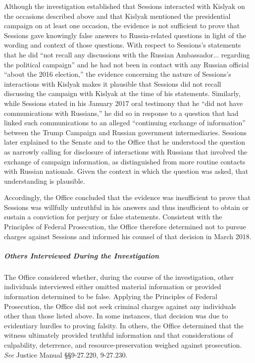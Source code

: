 Although the investigation established that Sessions interacted with Kislyak on the occasions described above and that Kislyak mentioned the presidential campaign on at least one occasion, the evidence is not sufficient to prove that Sessions gave knowingly false answers to Russia-related questions in light of the wording and context of those questions.
With respect to Sessions's statements that he did ``not recall any discussions with the Russian Ambassador... regarding the political campaign'' and he had not been in contact with any Russian official ``about the 2016 election,'' the evidence concerning the nature of Sessions's interactions with Kislyak makes it plausible that Sessions did not recall discussing the campaign with Kislyak at the time of his statements.
Similarly, while Sessions stated in his January 2017 oral testimony that he ``did not have communications with Russians,'' he did so in response to a question that had linked such communications to an alleged ``continuing exchange of information'' between the Trump Campaign and Russian government intermediaries.
Sessions later explained to the Senate and to the Office that he understood the question as narrowly calling for disclosure of interactions with Russians that involved the exchange of campaign information, as distinguished from more routine contacts with Russian nationals.
Given the context in which the question was asked, that understanding is plausible.

Accordingly, the Office concluded that the evidence was insufficient to prove that Sessions was willfully untruthful in his answers and thus insufficient to obtain or sustain a conviction for perjury or false statements.
Consistent with the Principles of Federal Prosecution, the Office therefore determined not to pursue charges against Sessions and informed his counsel of that decision in March 2018.

\subparagraph{Others Interviewed During the Investigation}
The Office considered whether, during the course of the investigation, other individuals interviewed either omitted material information or provided information determined to be false.
Applying the Principles of Federal Prosecution, the Office did not seek criminal charges against any individuals other than those listed above.
In some instances, that decision was due to evidentiary hurdles to proving falsity.
In others, the Office determined that the witness ultimately provided truthful information and that considerations of culpability, deterrence, and resource-preservation weighed against prosecution.
\textit{See} Justice Manual \S\S 9-27.220, 9-27.230.






